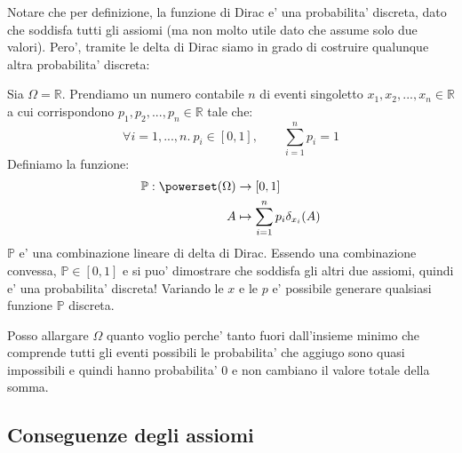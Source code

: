 Notare che per definizione, la funzione di Dirac e' una probabilita' discreta, dato che soddisfa tutti gli assiomi (ma non molto utile dato che assume solo due valori). Pero', tramite le delta di Dirac siamo in grado di costruire qualunque altra probabilita' discreta:

Sia $ \Omega = \mathbb{R}$. Prendiamo un numero contabile $ n $ di eventi singoletto $ x_1,x_2,...,x_n \in \mathbb{R} $ a cui corrispondono $ p_1,p_2,...,p_n \in \mathbb{R} $ tale che:
\[
 \forall i = 1,...,n.\ p_i \in [0,1], \qquad  \sum_{i=1}^{n} p_i = 1 
\]
Definiamo la funzione:
\[
\begin{aligned}
  \mathbb{P}: \powerset(\Omega) &\to [0,1]\\
  A &\mapsto \sum_{i=1}^{n} p_i \delta_{x_i}(A)
\end{aligned}
\]
$ \mathbb{P} $ e' una combinazione lineare di delta di Dirac. Essendo una combinazione convessa, $ \mathbb{P} \in [0,1] $ e si puo' dimostrare che soddisfa gli altri due assiomi, quindi e' una probabilita' discreta! Variando le $ x $ e le $ p $ e' possibile generare qualsiasi funzione $ \mathbb{P} $ discreta.




Posso allargare $ \Omega $ quanto voglio perche' tanto fuori dall'insieme minimo che comprende tutti gli eventi possibili le probabilita' che aggiugo sono quasi impossibili e quindi hanno probabilita' 0 e non cambiano il valore totale della somma.

\subsection{Conseguenze degli assiomi}


